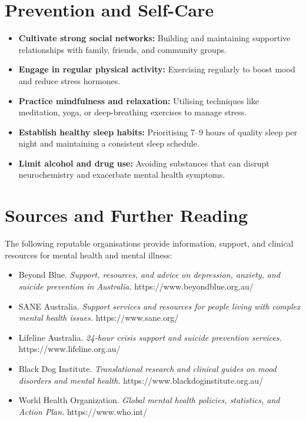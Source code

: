 \section*{Prevention and Self-Care}
\begin{itemize}
    \item \textbf{Cultivate strong social networks:} Building and maintaining supportive relationships with family, friends, and community groups.
    \item \textbf{Engage in regular physical activity:} Exercising regularly to boost mood and reduce stress hormones.
    \item \textbf{Practice mindfulness and relaxation:} Utilising techniques like meditation, yoga, or deep-breathing exercises to manage stress.
    \item \textbf{Establish healthy sleep habits:} Prioritising 7--9 hours of quality sleep per night and maintaining a consistent sleep schedule.
    \item \textbf{Limit alcohol and drug use:} Avoiding substances that can disrupt neurochemistry and exacerbate mental health symptoms.
\end{itemize}

\section*{Sources and Further Reading}
The following reputable organisations provide information, support, and clinical resources for mental health and mental illness:
\begin{itemize}
    \item Beyond Blue. \textit{Support, resources, and advice on depression, anxiety, and suicide prevention in Australia.} https://www.beyondblue.org.au/
    \item SANE Australia. \textit{Support services and resources for people living with complex mental health issues.} https://www.sane.org/
    \item Lifeline Australia. \textit{24-hour crisis support and suicide prevention services.} https://www.lifeline.org.au/
    \item Black Dog Institute. \textit{Translational research and clinical guides on mood disorders and mental health.} https://www.blackdoginstitute.org.au/
    \item World Health Organization. \textit{Global mental health policies, statistics, and Action Plan.} https://www.who.int/
\end{itemize}
